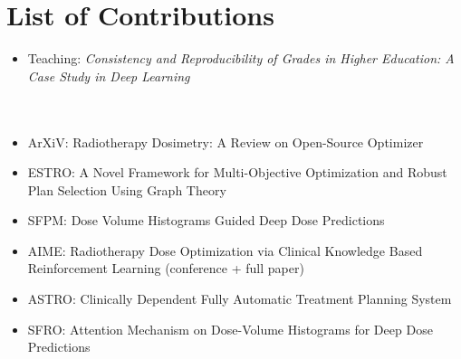 \chapter*{List of Contributions}
\Large

\begin{itemize}
	\item Teaching: \textit{Consistency and Reproducibility of Grades in Higher Education: A Case Study in Deep Learning}\\\\\\
	\item ArXiV: Radiotherapy Dosimetry: A Review on Open-Source Optimizer
	\item ESTRO: A Novel Framework for Multi-Objective Optimization and Robust Plan Selection Using Graph Theory
	\item SFPM: Dose Volume Histograms Guided Deep Dose Predictions
	\item AIME: Radiotherapy Dose Optimization via Clinical Knowledge Based Reinforcement Learning (conference + full paper)
	\item ASTRO: Clinically Dependent Fully Automatic Treatment Planning System
	\item SFRO: Attention Mechanism on Dose-Volume Histograms for Deep Dose Predictions
\end{itemize}

\normalsize